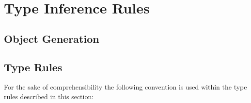 \chapter{Type Inference Rules}
\label{ctr:typeRules}
\section{Object Generation}
%

\section{Type Rules}
For the sake of comprehensibility the following convention is used within
the type rules described in this section:

